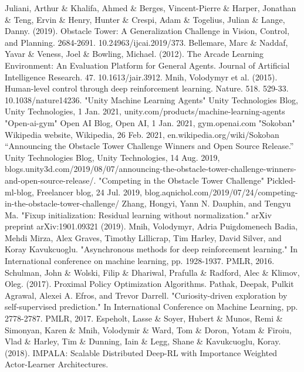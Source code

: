 \documentclass[conference]{IEEEtran}
\begin{document}
\begin{thebibliography}{00}
 Juliani, Arthur \& Khalifa, Ahmed \& Berges, Vincent-Pierre \& Harper, Jonathan \& Teng, Ervin \& Henry, Hunter \& Crespi, Adam \& Togelius, Julian \& Lange, Danny. (2019). Obstacle Tower: A Generalization Challenge in Vision, Control, and Planning. 2684-2691. 10.24963/ijcai.2019/373.
 Bellemare, Marc \& Naddaf, Yavar \& Veness, Joel \& Bowling, Michael. (2012). The Arcade Learning Environment: An Evaluation Platform for General Agents. Journal of Artificial Intelligence Research. 47. 10.1613/jair.3912.
 Mnih, Volodymyr et al. (2015). Human-level control through deep reinforcement learning. Nature. 518. 529-33. 10.1038/nature14236.
 "Unity Machine Learning Agents" Unity Technologies Blog, Unity Technologies, 1 Jan. 2021, unity.com/products/machine-learning-agents
 "Open-ai-gym" Open AI Blog, Open AI, 1 Jan. 2021, gym.openai.com
 "Sokoban" Wikipedia website, Wikipedia, 26 Feb. 2021, en.wikipedia.org/wiki/Sokoban
 “Announcing the Obstacle Tower Challenge Winners and Open Source Release.” Unity Technologies Blog, Unity Technologies, 14 Aug. 2019, blogs.unity3d.com/2019/08/07/announcing-the-obstacle-tower-challenge-winners-and-open-source-release/.
 "Competing in the Obstacle Tower Challenge" Pickled-ml-blog, Freelancer blog, 24 Jul. 2019, blog.aqnichol.com/2019/07/24/competing-in-the-obstacle-tower-challenge/
 Zhang, Hongyi, Yann N. Dauphin, and Tengyu Ma. "Fixup initialization: Residual learning without normalization." arXiv preprint arXiv:1901.09321 (2019).
 Mnih, Volodymyr, Adria Puigdomenech Badia, Mehdi Mirza, Alex Graves, Timothy Lillicrap, Tim Harley, David Silver, and Koray Kavukcuoglu. "Asynchronous methods for deep reinforcement learning." In International conference on machine learning, pp. 1928-1937. PMLR, 2016.
 Schulman, John \& Wolski, Filip \& Dhariwal, Prafulla \& Radford, Alec \& Klimov, Oleg. (2017). Proximal Policy Optimization Algorithms.
 Pathak, Deepak, Pulkit Agrawal, Alexei A. Efros, and Trevor Darrell. "Curiosity-driven exploration by self-supervised prediction." In International Conference on Machine Learning, pp. 2778-2787. PMLR, 2017.
 Espeholt, Lasse \& Soyer, Hubert \& Munos, Remi \& Simonyan, Karen \& Mnih, Volodymir \& Ward, Tom \& Doron, Yotam \& Firoiu, Vlad \& Harley, Tim \& Dunning, Iain \& Legg, Shane \& Kavukcuoglu, Koray. (2018). IMPALA: Scalable Distributed Deep-RL with Importance Weighted Actor-Learner Architectures.
\end{thebibliography}
\vspace{12pt}
\end{document}
